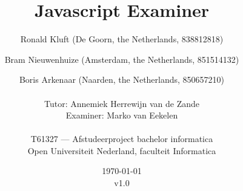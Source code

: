 
\title{Javascript Examiner}
\author{
  Ronald Kluft (De Goorn, the Netherlands, 838812818) \and
  Bram Nieuwenhuize (Amsterdam, the Netherlands, 851514132) \and
  Boris Arkenaar (Naarden, the Netherlands, 850657210)\\
  \\
  Tutor: Annemiek Herrewijn van de Zande\\
  Examiner: Marko van Eekelen\\
  \\
  T61327 --- Afstudeerproject bachelor informatica\\
  Open Universiteit Nederland, faculteit Informatica}
\date{\today\\v1.0}
\maketitle

